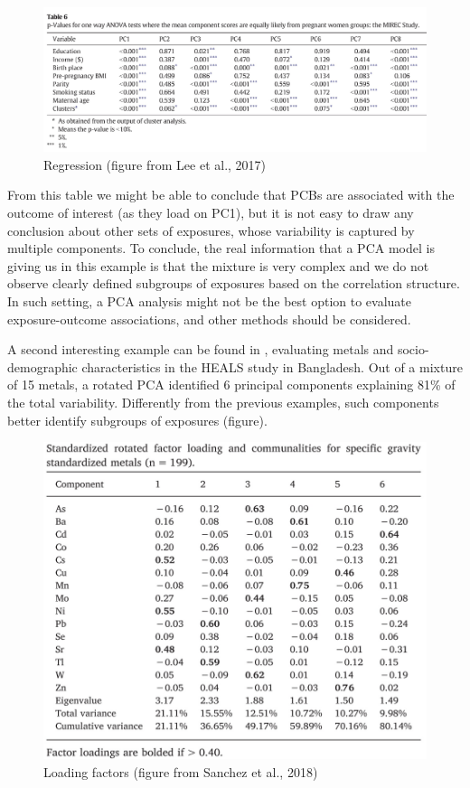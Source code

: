 \documentclass[
]{book}
\begin{document}
\begin{figure}
\centering
\includegraphics{images/table6.png}
\caption{Regression (figure from Lee et al., 2017)}
\end{figure}

From this table we might be able to conclude that PCBs are associated with the outcome of interest (as they load on PC1), but it is not easy to draw any conclusion about other sets of exposures, whose variability is captured by multiple components. To conclude, the real information that a PCA model is giving us in this example is that the mixture is very complex and we do not observe clearly defined subgroups of exposures based on the correlation structure. In such setting, a PCA analysis might not be the best option to evaluate exposure-outcome associations, and other methods should be considered.

A second interesting example can be found in \citet{sanchez2018urinary}, evaluating metals and socio-demographic characteristics in the HEALS study in Bangladesh. Out of a mixture of 15 metals, a rotated PCA identified 6 principal components explaining 81\% of the total variability. Differently from the previous examples, such components better identify subgroups of exposures (figure).

\begin{figure}
\centering
\includegraphics{images/tableaa.png}
\caption{Loading factors (figure from Sanchez et al., 2018)}
\end{figure}
\end{document}
